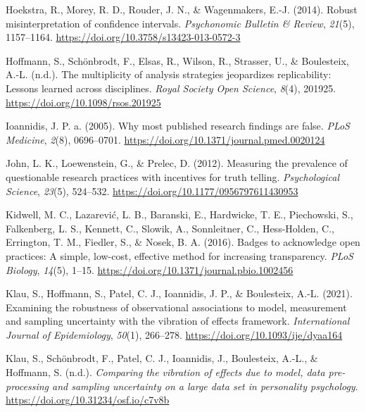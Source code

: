 \documentclass[
  letterpaper,
  DIV=11,
  numbers=noendperiod]{scrreprt}
\newlength{\cslhangindent}
\newlength{\cslentryspacingunit} %
\newenvironment{CSLReferences}[2] %
 {%
  \setlength{\parindent}{0pt}
  \ifodd #1
  \let\oldpar\par
  \def\par{\hangindent=\cslhangindent\oldpar}
  \fi
  \setlength{\parskip}{#2\cslentryspacingunit}
 }%
 {}
\begin{document}
\begin{CSLReferences}{1}{0}
\leavevmode{}%
Hoekstra, R., Morey, R. D., Rouder, J. N., \& Wagenmakers, E.-J. (2014).
Robust misinterpretation of confidence intervals. \emph{Psychonomic
Bulletin \& Review}, \emph{21}(5), 1157--1164.
\url{https://doi.org/10.3758/s13423-013-0572-3}

\leavevmode{}%
Hoffmann, S., Schönbrodt, F., Elsas, R., Wilson, R., Strasser, U., \&
Boulesteix, A.-L. (n.d.). The multiplicity of analysis strategies
jeopardizes replicability: Lessons learned across disciplines.
\emph{Royal Society Open Science}, \emph{8}(4), 201925.
\url{https://doi.org/10.1098/rsos.201925}

\leavevmode{}%
Ioannidis, J. P. a. (2005). Why most published research findings are
false. \emph{PLoS Medicine}, \emph{2}(8), 0696--0701.
\url{https://doi.org/10.1371/journal.pmed.0020124}

\leavevmode{}%
John, L. K., Loewenstein, G., \& Prelec, D. (2012). Measuring the
prevalence of questionable research practices with incentives for truth
telling. \emph{Psychological Science}, \emph{23}(5), 524--532.
\url{https://doi.org/10.1177/0956797611430953}

\leavevmode{}%
Kidwell, M. C., Lazarević, L. B., Baranski, E., Hardwicke, T. E.,
Piechowski, S., Falkenberg, L. S., Kennett, C., Slowik, A., Sonnleitner,
C., Hess-Holden, C., Errington, T. M., Fiedler, S., \& Nosek, B. A.
(2016). Badges to acknowledge open practices: A simple, low-cost,
effective method for increasing transparency. \emph{PLoS Biology},
\emph{14}(5), 1--15. \url{https://doi.org/10.1371/journal.pbio.1002456}

\leavevmode{}%
Klau, S., Hoffmann, S., Patel, C. J., Ioannidis, J. P., \& Boulesteix,
A.-L. (2021). Examining the robustness of observational associations to
model, measurement and sampling uncertainty with the vibration of
effects framework. \emph{International Journal of Epidemiology},
\emph{50}(1), 266--278. \url{https://doi.org/10.1093/ije/dyaa164}

\leavevmode{}%
Klau, S., Schönbrodt, F., Patel, C. J., Ioannidis, J., Boulesteix,
A.-L., \& Hoffmann, S. (n.d.). \emph{Comparing the vibration of effects
due to model, data pre-processing and sampling uncertainty on a large
data set in personality psychology}.
\url{https://doi.org/10.31234/osf.io/c7v8b}


\end{CSLReferences}
\end{document}
